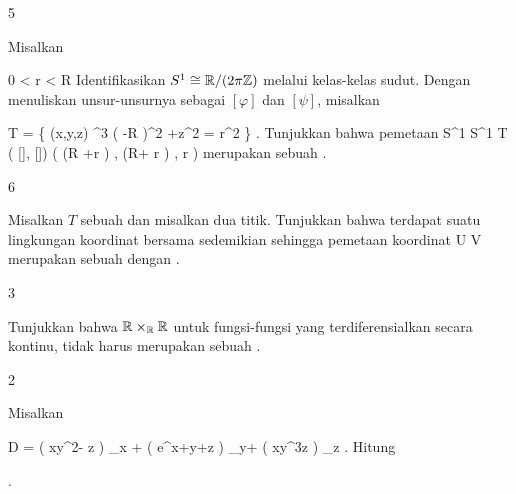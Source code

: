 
{5}
{

Misalkan

\mavergleichskette
{\vergleichskette
{ 0
}
{ < }{ r
}
{ < }{ R
}
{    }{
}
{   }{
}
}
{}{}{}
Identifikasikan $S^1 \cong {\mathbb R}/(2\pi{\mathbb Z})$ melalui kelas-kelas sudut. Dengan menuliskan unsur-unsurnya sebagai $[\varphi]$ dan $[\psi]$, misalkan

\mavergleichskettedisp
{\vergleichskette
{ T
}
{ =} { \left\{ (x,y,z) \in \R^3  \mid   \left(   -R  \right)^2 +z^2 = r^2         \right\}
}
{ } {
}
{ } {
}
{ } {
}
}
{}{}{.}
Tunjukkan bahwa pemetaan
\maabbeledisp {} { S^1 \times S^1 } { T
} { ( [\varphi], [\psi]) } {( (R +r \cos  \psi) \cos \varphi, (R+ r \cos  \psi ) \sin \varphi ,  r \sin  \psi )
} {}
merupakan sebuah
.

}
{} {}

{6}
{

Misalkan $T$ sebuah
dan misalkan
 dua titik. Tunjukkan bahwa terdapat suatu lingkungan koordinat bersama
 sedemikian sehingga pemetaan koordinat
\maabbdisp {\alpha} { U } { V
} {}
merupakan sebuah
dengan
\mathl{V= {]0,1[} \times  {]0,1[}}{}.

}
{} {}

{3}
{

Tunjukkan bahwa
${\mathbb R} \times_{\mathbb R} {\mathbb R}$ untuk fungsi-fungsi yang terdiferensialkan secara kontinu,
 {\R} {\R
} {}
tidak harus merupakan sebuah
.

}
{} {}

{2}
{

Misalkan

\mavergleichskettedisp
{\vergleichskette
{ D
}
{ =} { \left(  xy^2-  \sin z  \right)  \partial_x +  \left(  e^{x+y+z}  \right) \partial_y+  \left(  xy^3z  \right) \partial_z
}
{ } {
}
{ } {
}
{ } {
}
}
{}{}{.}
Hitung

 { . }

}
{} {}

